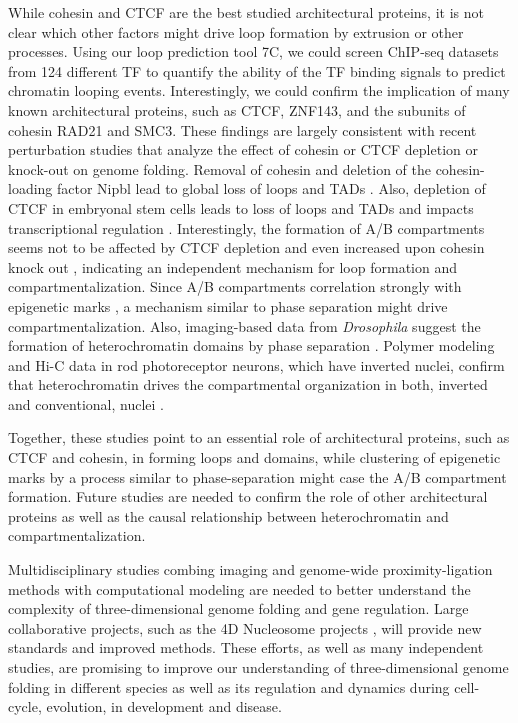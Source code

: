 \documentclass[a4paper,twoside=true,openright,parskip=full,chapterprefix=true,11pt,headings=normal,bibliography=totoc,listof=totoc,titlepage=on,captions=tableabove,draft=false]{scrreprt}
\theoremstyle{definition}
\theoremstyle{definition}
\theoremstyle{definition}
\theoremstyle{remark}
\begin{document}
While cohesin and CTCF are the best studied architectural proteins, it
is not clear which other factors might drive loop formation by extrusion
or other processes. Using our loop prediction tool 7C, we could screen
ChIP-seq datasets from 124 different TF to quantify the ability of the
TF binding signals to predict chromatin looping events. Interestingly,
we could confirm the implication of many known architectural proteins,
such as CTCF, ZNF143, and the subunits of cohesin RAD21 and SMC3. These
findings are largely consistent with recent perturbation studies that
analyze the effect of cohesin or CTCF depletion or knock-out on genome
folding. Removal of cohesin and deletion of the cohesin-loading factor
Nipbl lead to global loss of loops and TADs
\citep{Rao2017, Schwarzer2017}. Also, depletion of CTCF in embryonal
stem cells leads to loss of loops and TADs and impacts transcriptional
regulation \citep{Nora2017}. Interestingly, the formation of A/B
compartments seems not to be affected by CTCF depletion \citep{Nora2017}
and even increased upon cohesin knock out \citep{Schwarzer2017},
indicating an independent mechanism for loop formation and
compartmentalization. Since A/B compartments correlation strongly with
epigenetic marks \citep{Fortin2015, DiPierro2017, Prakash2017}, a
mechanism similar to phase separation might drive compartmentalization.
Also, imaging-based data from \emph{Drosophila} suggest the formation of
heterochromatin domains by phase separation \citep{Strom2017}. Polymer
modeling and Hi-C data in rod photoreceptor neurons, which have inverted
nuclei, confirm that heterochromatin drives the compartmental
organization in both, inverted and conventional, nuclei
\citep{Falk2018}.

Together, these studies point to an essential role of architectural
proteins, such as CTCF and cohesin, in forming loops and domains, while
clustering of epigenetic marks by a process similar to phase-separation
might case the A/B compartment formation. Future studies are needed to
confirm the role of other architectural proteins as well as the causal
relationship between heterochromatin and compartmentalization.

Multidisciplinary studies combing imaging and genome-wide
proximity-ligation methods with computational modeling are needed to
better understand the complexity of three-dimensional genome folding and
gene regulation. Large collaborative projects, such as the 4D Nucleosome
projects \citep{Dekker2017a}, will provide new standards and improved
methods. These efforts, as well as many independent studies, are
promising to improve our understanding of three-dimensional genome
folding in different species as well as its regulation and dynamics
during cell-cycle, evolution, in development and disease.
\end{document}
